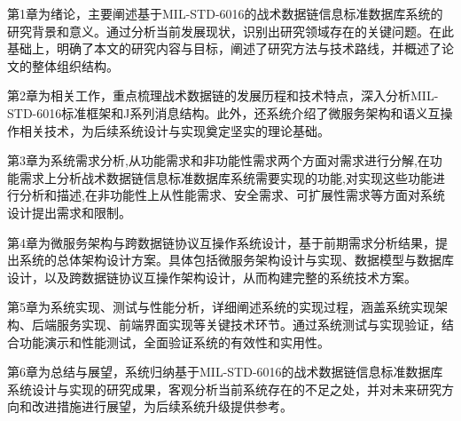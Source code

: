 第1章为绪论，主要阐述基于MIL-STD-6016的战术数据链信息标准数据库系统的研究背景和意义。通过分析当前发展现状，识别出研究领域存在的关键问题。在此基础上，明确了本文的研究内容与目标，阐述了研究方法与技术路线，并概述了论文的整体组织结构。

第2章为相关工作，重点梳理战术数据链的发展历程和技术特点，深入分析MIL-STD-6016标准框架和J系列消息结构。此外，还系统介绍了微服务架构和语义互操作相关技术，为后续系统设计与实现奠定坚实的理论基础。

第3章为系统需求分析,从功能需求和非功能性需求两个方面对需求进行分解,在功能需求上分析战术数据链信息标准数据库系统需要实现的功能,对实现这些功能进行分析和描述,在非功能性上从性能需求、安全需求、可扩展性需求等方面对系统设计提出需求和限制。

第4章为微服务架构与跨数据链协议互操作系统设计，基于前期需求分析结果，提出系统的总体架构设计方案。具体包括微服务架构设计与实现、数据模型与数据库设计，以及跨数据链协议互操作架构设计，从而构建完整的系统技术方案。

第5章为系统实现、测试与性能分析，详细阐述系统的实现过程，涵盖系统实现架构、后端服务实现、前端界面实现等关键技术环节。通过系统测试与实现验证，结合功能演示和性能测试，全面验证系统的有效性和实用性。

第6章为总结与展望，系统归纳基于MIL-STD-6016的战术数据链信息标准数据库系统设计与实现的研究成果，客观分析当前系统存在的不足之处，并对未来研究方向和改进措施进行展望，为后续系统升级提供参考。
